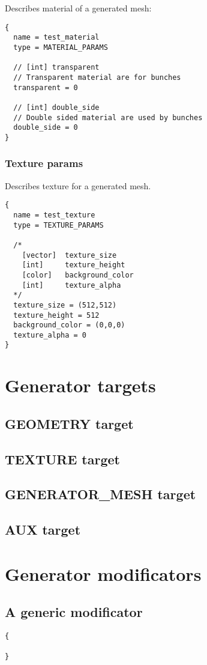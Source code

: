 \documentclass[11pt]{article}
\begin{document}
Describes material of a generated mesh:

\begin{verbatim}
{
  name = test_material
  type = MATERIAL_PARAMS
  
  // [int] transparent
  // Transparent material are for bunches
  transparent = 0
  
  // [int] double_side
  // Double sided material are used by bunches
  double_side = 0  
}
\end{verbatim}

\subsubsection{Texture params}

Describes texture for a generated mesh.

\begin{verbatim}
{
  name = test_texture
  type = TEXTURE_PARAMS

  /*
    [vector]  texture_size
    [int]     texture_height
    [color]   background_color
    [int]     texture_alpha
  */
  texture_size = (512,512)  
  texture_height = 512
  background_color = (0,0,0)
  texture_alpha = 0
}
\end{verbatim}

\section{Generator targets}
\subsection{GEOMETRY target}
\subsection{TEXTURE target}
\subsection{GENERATOR\_MESH target}
\subsection{AUX target}

\section{Generator modificators}

\subsection{A generic modificator}
\begin{verbatim}
{

}
\end{verbatim}
\end{document}
